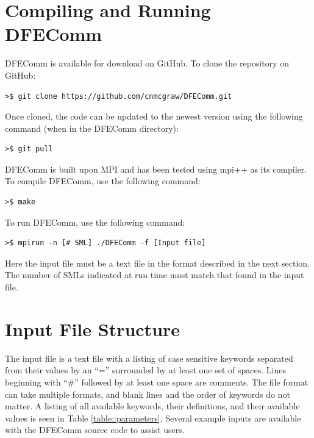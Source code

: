 \documentclass{article}
\begin{document}
\section{Compiling and Running DFEComm}
DFEComm is available for download on GitHub. To clone the repository on GitHub:
\begin{verbatim}
>$ git clone https://github.com/cnmcgraw/DFEComm.git
\end{verbatim}
Once cloned, the code can be updated to the newest version using the following command (when in the DFEComm directory):
\begin{verbatim}
>$ git pull
\end{verbatim}
  DFEComm is built upon MPI and has been tested using mpi++ as its compiler. To compile DFEComm, use the following command:
\begin{verbatim}
>$ make
\end{verbatim}
To run DFEComm, use the following command:
\begin{verbatim}
>$ mpirun -n [# SML] ./DFEComm -f [Input file]
\end{verbatim}
Here the input file must be a text file in the format described in the next section. The number of SMLs indicated at run time must match that found in the input file.

\section{Input File Structure}
The input file is a text file with a listing of case sensitive keywords separated from their values by an ``='' surrounded by at least one set of spaces. Lines beginning with ``\#'' followed by at least one space are comments. The file format can take multiple formats, and blank lines and the order of keywords do not matter. A listing of all available keywords, their definitions, and their available values is seen in Table \ref{table::parameters}.  Several example inputs are available with the DFEComm source code to assist users. \\
\end{document}
